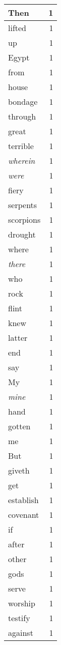 \begin{center}
\begin{longtable}{l|r}
Then & 1 \\ \hline
lifted & 1 \\ \hline
up & 1 \\ \hline
Egypt & 1 \\ \hline
from & 1 \\ \hline
house & 1 \\ \hline
bondage & 1 \\ \hline
through & 1 \\ \hline
great & 1 \\ \hline
terrible & 1 \\ \hline
\emph{wherein} & 1 \\ \hline
\emph{were} & 1 \\ \hline
fiery & 1 \\ \hline
serpents & 1 \\ \hline
scorpions & 1 \\ \hline
drought & 1 \\ \hline
where & 1 \\ \hline
\emph{there} & 1 \\ \hline
who & 1 \\ \hline
rock & 1 \\ \hline
flint & 1 \\ \hline
knew & 1 \\ \hline
latter & 1 \\ \hline
end & 1 \\ \hline
say & 1 \\ \hline
My & 1 \\ \hline
\emph{mine} & 1 \\ \hline
hand & 1 \\ \hline
gotten & 1 \\ \hline
me & 1 \\ \hline
But & 1 \\ \hline
giveth & 1 \\ \hline
get & 1 \\ \hline
establish & 1 \\ \hline
covenant & 1 \\ \hline
if & 1 \\ \hline
after & 1 \\ \hline
other & 1 \\ \hline
gods & 1 \\ \hline
serve & 1 \\ \hline
worship & 1 \\ \hline
testify & 1 \\ \hline
against & 1 \\ \hline

\end{longtable}
\end{center}
